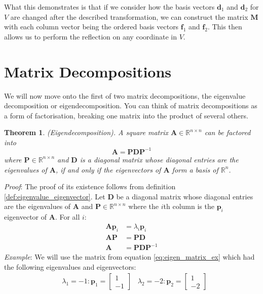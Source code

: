 \documentclass[a4paper,12pt]{article}
\newcommand{\matrx}[1]{\bm{#1}}
\newcommand{\vectr}[1]{\textbf{#1}}
\newcommand{\real}{\mathbb{R}}
\newcommand{\italic}[1]{\textit{#1}}
\newtheorem{theorem}{Theorem}[section]
\begin{document}
	What this demonstrates is that if we consider how the basis vectors $ \vectr{d}_1 $ and $ \vectr{d}_2 $ for $ V $ are changed after the described transformation, we can construct the matrix $ \matrx{M} $ with each column vector being the ordered basis vectors $ \vectr{f}_1 $ and $ \vectr{f}_2 $. This then allows us to perform the reflection on any coordinate in $ V $. 
	\section{Matrix Decompositions}
	We will now move onto the first of two matrix decompositions, the eigenvalue decomposition or eigendecomposition. You can think of matrix decompositions as a form of factorisation, breaking one matrix into the product of several others. 
	\begin{theorem}
		\normalfont (Eigendecomposition).\cite[page 116]{mml_book} A square matrix $ \matrx{A} \in \real^{n \times n} $ can be factored into $$ \matrx{A} = \matrx{P}\matrx{D}\matrx{P}^{-1} $$ where $ \matrx{P} \in \real^{n \times n} $ and $ \matrx{D} $ is a diagonal matrix whose diagonal entries are the eigenvalues of $ \matrx{A} $, if and only if the eigenvectors of $ \matrx{A} $ form a basis of $ \real^n $. 
	\end{theorem}
	\italic{Proof}: The proof of its existence follows from definition \ref{def:eigenvalue_eigenvector}. Let $ \matrx{D} $ be a diagonal matrix whose diagonal entries are the eigenvalues of $ \matrx{A} $ and $ \matrx{P} \in \real^{n \times n} $ where the $ i $th column is the $ \vectr{p}_i $ eigenvector of $ \matrx{A} $. For all $ i $:
	\begin{align}
		\matrx{A}\vectr{p}_i &= \lambda_i\vectr{p}_i \\
		\matrx{A}\matrx{P} &= \matrx{P}\matrx{D} \\
		\matrx{A} &= \matrx{P}\matrx{D}\matrx{P}^{-1} 
	\end{align}
	\italic{Example}: We will use the matrix from equation \ref{eq:eigen_matrix_ex} which had the following eigenvalues and eigenvectors:
	\begin{align}
		\hspace{10pt} \lambda_1 = -1: \vectr{p}_1 = \begin{bmatrix}
			1 \\ -1
		\end{bmatrix}  \hspace{10pt} \lambda_2 = -2: \vectr{p}_2 = \begin{bmatrix}
			1 \\ -2
		\end{bmatrix}
	\end{align} 
\end{document}
